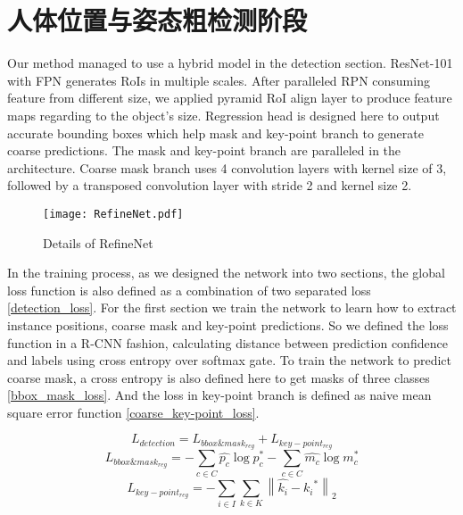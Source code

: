 \section{人体位置与姿态粗检测阶段}
\label{sec:detectionstage}
Our method managed to use a hybrid model in the detection section. ResNet-101 with FPN generates RoIs in multiple scales. After paralleled RPN consuming feature from different size, we applied pyramid RoI align layer to produce feature maps regarding to the object's size. Regression head is designed here to output accurate bounding boxes which help mask and key-point branch to generate coarse predictions. The mask and key-point branch are paralleled in the architecture. Coarse mask branch uses 4 convolution layers with kernel size of 3, followed by a transposed convolution layer with stride 2 and kernel size 2.

\begin{figure*}[htbp]
	\centering
	\texttt{[image: RefineNet.pdf]}
	\caption{Details of RefineNet}
	\label{fig:RefineNet}
\end{figure*}

In the training process, as we designed the network into two sections, the global loss function is also defined as a combination of two separated loss \eqref{detection_loss}. For the first section we train the network to learn how to extract instance positions, coarse mask and key-point predictions. So we defined the loss function in a R-CNN fashion, calculating distance between prediction confidence and labels using cross entropy over softmax gate. To train the network to predict coarse mask, a cross entropy is also defined here to get masks of three classes \eqref{bbox_mask_loss}. And the loss in key-point branch is defined as naive mean square error function \eqref{coarse_key-point_loss}.

\begin{equation}
\label{detection_loss}
L_{detection} = L_{bbox\&mask_{reg}} + L_{key-point_{reg}}
\end{equation}      
\begin{equation}
\label{bbox_mask_loss}
L_{bbox\&mask_{reg}} = -\sum_{c \in C}{\hat{p_c} \log{p_c^{*}}}  -\sum_{c \in C}{\hat{m_c} \log{m_c^{*}}}
\end{equation}
\begin{equation}
\label{coarse_key-point_loss}
L_{key-point_{reg}} = -\sum_{i \in I}\sum_{k \in K}{\left\| \hat{k_i} - {k_i}^{*} \right\|_2}
\end{equation}


